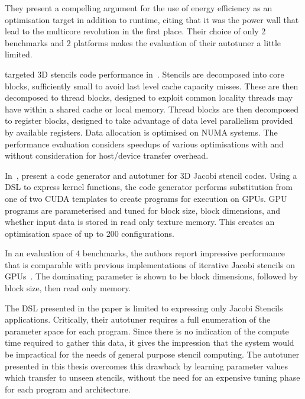 They present a compelling argument for the use of energy efficiency as
an optimisation target in addition to runtime, citing that it was the
power wall that lead to the multicore revolution in the first
place. Their choice of only 2 benchmarks and 2 platforms makes the
evaluation of their autotuner a little limited.

\citeauthor{Berkeley2009} targeted 3D stencils code performance
in~\cite{Berkeley2009}. Stencils are decomposed into core blocks,
sufficiently small to avoid last level cache capacity misses. These
are then decomposed to thread blocks, designed to exploit common
locality threads may have within a shared cache or local
memory. Thread blocks are then decomposed to register blocks, designed
to take advantage of data level parallelism provided by available
registers. Data allocation is optimised on NUMA systems. The
performance evaluation considers speedups of various optimisations
with and without consideration for host/device transfer overhead.


In~\cite{Zhang2013a}, \citeauthor{Zhang2013a} present a code generator
and autotuner for 3D Jacobi stencil codes. Using a DSL to express
kernel functions, the code generator performs substitution from one of
two CUDA templates to create programs for execution on GPUs. GPU
programs are parameterised and tuned for block size, block dimensions,
and whether input data is stored in read only texture memory. This
creates an optimisation space of up to 200 configurations.

In an evaluation of 4 benchmarks, the authors report impressive
performance that is comparable with previous implementations of
iterative Jacobi stencils on
GPUs~\cite{Holewinski2012,Phillips2010}. The dominating parameter is
shown to be block dimensions, followed by block size, then read only
memory.

%

The DSL presented in the paper is limited to expressing only Jacobi
Stencils applications. Critically, their autotuner requires a full
enumeration of the parameter space for each program. Since there is no
indication of the compute time required to gather this data, it gives
the impression that the system would be impractical for the needs of
general purpose stencil computing. The autotuner presented in this
thesis overcomes this drawback by learning parameter values which
transfer to unseen stencils, without the need for an expensive tuning
phase for each program and architecture.

